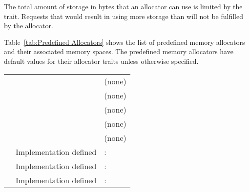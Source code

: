The total amount of storage in bytes that an allocator can use is limited by the {} trait. Requests that would result in using more storage than {} will not be fulfilled by the allocator. 

Table~\ref{tab:Predefined Allocators} shows the list of predefined memory allocators and their associated memory spaces. The predefined memory allocators have default values for their allocator traits unless otherwise specified.

\nolinenumbers
\renewcommand{\arraystretch}{1.5}
\tablelasttail{\hline}
\begin{supertabular}{p{1.8in}p{2in}p{1.2in}}
{} & {} & (none)\\
{} & {} & (none)\\
{} & {}& (none)\\
{} & {} & (none)\\
{} & {} & (none)\\
{} & Implementation defined & {}:{}\\
{} & Implementation defined & {}:{}\\
{} & Implementation defined & {}:{}\\
\end{supertabular}
\linenumbers

